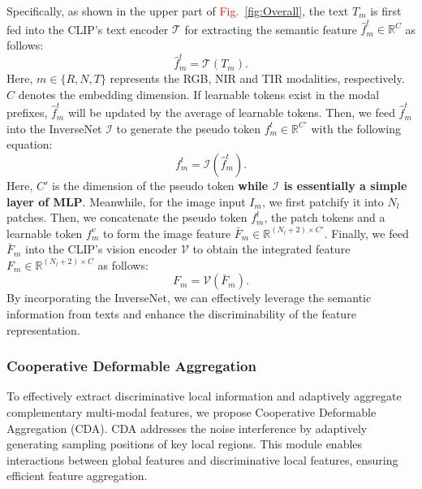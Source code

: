 Specifically, as shown in the upper part of \textcolor{red}{Fig.}~\ref{fig:Overall}, the text $T_{m}$ is first fed into the CLIP's text encoder $\mathcal{T}$ for extracting the semantic feature $\hat{f}^{t}_{m} \in \mathbb{R}^{C}$ as follows:
%
\begin{equation}
    \hat{f}^{t}_{m} = \mathcal{T}(T_{m}).
\end{equation}
Here, $m \in \{R, N, T\}$ represents the RGB, NIR and TIR modalities, respectively.
%
$C$ denotes the embedding dimension.
%
If learnable tokens exist in the modal prefixes, $\hat{f}^{t}_{m}$ will be updated by the average of learnable tokens.
%
Then, we feed $\hat{f}^{t}_{m}$ into the InverseNet $\mathcal{I}$ to generate the pseudo token $f^{t}_{m} \in \mathbb{R}^{C'}$ with the following equation:
\begin{equation}
    f^{t}_{m} = \mathcal{I}(\hat{f}^{t}_{m}).
\end{equation}
Here, $C'$ is the dimension of the pseudo token \textbf{while $\mathcal{I}$ is essentially a simple layer of MLP}.
%
Meanwhile, for the image input $I_{m}$, we first patchify it into $N_l$ patches.
%
Then, we concatenate the pseudo token \( f^{t}_{m} \), the patch tokens and a learnable token \( f^{v}_{m} \) to form the image feature \( \bar{F}_{m} \in \mathbb{R}^{(N_l + 2)\times C'} \).
%
Finally, we feed \( \bar{F}_{m} \) into the CLIP's vision encoder \( \mathcal{V} \) to obtain the integrated feature \( F_{m} \in \mathbb{R}^{(N_l + 2) \times C} \) as follows:
\begin{equation}
    F_{m} = \mathcal{V}(\bar{F}_{m}).
\end{equation}
By incorporating the InverseNet, we can effectively leverage the semantic information from texts and enhance the discriminability of the feature representation.

\subsubsection{Cooperative Deformable Aggregation}
To effectively extract discriminative local information and adaptively aggregate complementary multi-modal features, we propose Cooperative Deformable Aggregation (CDA).
%
%
CDA addresses the noise interference by adaptively generating sampling positions of key local regions.
%
This module enables interactions between global features and discriminative local features, ensuring efficient feature aggregation.


